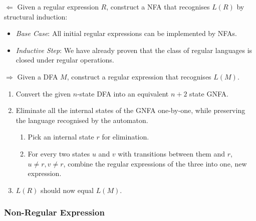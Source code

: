 {\(\Leftarrow\) Given a regular expression \(R\), construct a NFA that recognises \(L(R)\) by structural induction:
\begin{itemize}
    \item \textit{Base Case}: All initial regular expressions can be implemented by NFAs.
    \item \textit{Inductive Step}: We have already proven that the class of regular languages is closed under regular operations.
\end{itemize}

\noindent \(\Rightarrow\) Given a DFA \(M\), construct a regular expression that recognises \(L(M)\).
\begin{enumerate}
    \item Convert the given \(n\)-state DFA into an equivalent \(n+2\) state GNFA.
    \item Eliminate all the internal states of the GNFA one-by-one, while preserving the language recognised by the automaton.
    \begin{enumerate}
        \item Pick an internal state \(r\) for elimination.
        \item For every two states \(u\) and \(v\) with transitions between them and \(r\), \(u \neq r, v \neq r\), combine the regular expressions of the three into one, new expression.
    \end{enumerate}
    \item \(L(R)\) should now equal \(L(M)\).
\end{enumerate}}


\subsubsection{Non-Regular Expression}


